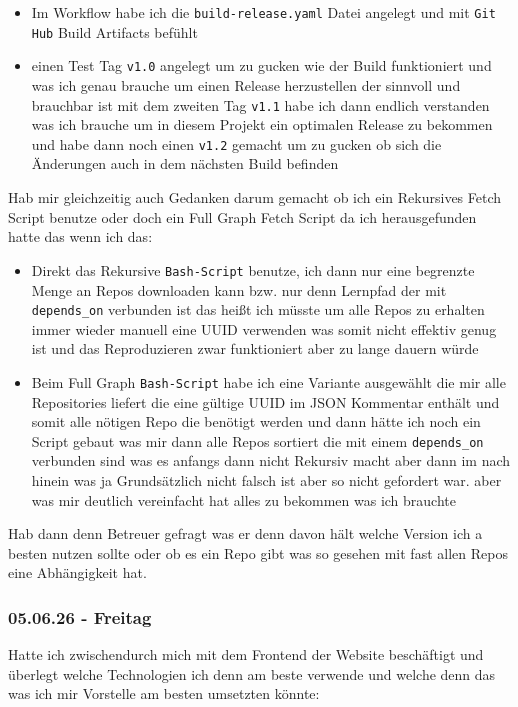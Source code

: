 \begin{itemize}[itemsep=2pt, topsep=4pt]
  \item Im Workflow habe ich die \texttt{build-release.yaml} Datei angelegt und mit \texttt{Git Hub} Build Artifacts befühlt
  \item einen Test Tag \texttt{v1.0} angelegt um zu gucken wie der Build funktioniert und was ich genau brauche um einen Release herzustellen der sinnvoll und brauchbar ist mit dem zweiten Tag \texttt{v1.1} habe ich dann endlich verstanden was ich brauche um in diesem Projekt ein optimalen Release zu bekommen und habe dann noch einen \texttt{v1.2} gemacht um zu gucken ob sich die Änderungen auch in dem nächsten Build befinden
\end{itemize}
Hab mir gleichzeitig auch Gedanken darum gemacht ob ich ein Rekursives Fetch Script benutze oder doch ein Full Graph Fetch Script da ich herausgefunden hatte das wenn ich das:

\begin{itemize}[itemsep=2pt, topsep=4pt]
  \item Direkt das Rekursive \texttt{Bash-Script} benutze, ich dann nur eine begrenzte Menge an Repos downloaden kann bzw. nur denn Lernpfad der mit \texttt{depends\_on} verbunden ist das heißt ich müsste um alle Repos zu erhalten immer wieder manuell eine UUID verwenden was somit nicht effektiv genug ist und das Reproduzieren zwar funktioniert aber zu lange dauern würde
  \item Beim Full Graph \texttt{Bash-Script} habe ich eine Variante ausgewählt die mir alle Repositories liefert die eine gültige UUID im JSON Kommentar enthält und somit alle nötigen Repo die benötigt werden und dann hätte ich noch ein Script gebaut was mir dann alle Repos sortiert die mit einem \texttt{depends\_on} verbunden sind was es anfangs dann nicht Rekursiv macht aber dann im nach hinein was ja Grundsätzlich nicht falsch ist aber so nicht gefordert war. aber was mir deutlich vereinfacht hat alles zu bekommen was ich brauchte
\end{itemize}
Hab dann denn Betreuer gefragt was er denn davon hält welche Version ich a besten nutzen sollte oder ob es ein Repo gibt was so gesehen mit fast allen Repos eine Abhängigkeit hat.

\subsubsection{05.06.26 - Freitag}

Hatte ich zwischendurch mich mit dem Frontend der Website beschäftigt und überlegt welche Technologien ich denn am beste verwende und welche denn das was ich mir Vorstelle am besten umsetzten könnte:

